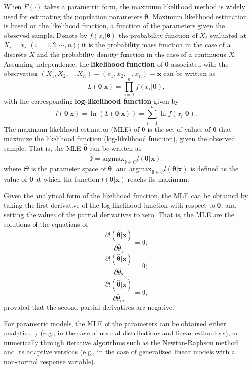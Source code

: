 \documentclass[]{book}
\theoremstyle{definition}
\theoremstyle{definition}
\theoremstyle{definition}
\theoremstyle{remark}
\begin{document}
When \(F(\cdot)\) takes a parametric form, the maximum likelihood method
is widely used for estimating the population parameters
\(\boldsymbol{\theta}\). Maximum likelihood estimation is based on the
likelihood function, a function of the parameters given the observed
sample. Denote by \(f(x_i|\boldsymbol{\theta})\) the probability
function of \(X_i\) evaluated at \(X_i=x_i\) \((i=1,2,\cdots,n)\); it is
the probability mass function in the case of a discrete \(X\) and the
probability density function in the case of a continuous \(X\). Assuming
independence, the \textbf{likelihood function} of
\(\boldsymbol{\theta}\) associated with the observation
\((X_1,X_2,\cdots,X_n)=(x_1,x_2,\cdots,x_n)=\mathbf{x}\) can be written
as
\[L(\boldsymbol{\theta}|\mathbf{x})=\prod_{i=1}^nf(x_i|\boldsymbol{\theta}),\]
with the corresponding \textbf{log-likelihood function} given by
\[l(\boldsymbol{\theta}|\mathbf{x})=\ln(L(\boldsymbol{\theta}|\mathbf{x}))=\sum_{i=1}^n\ln f(x_i|\boldsymbol{\theta}).\]
The maximum likelihood estimator (MLE) of \(\boldsymbol{\theta}\) is the
set of values of \(\boldsymbol{\theta}\) that maximize the likelihood
function (log-likelihood function), given the observed sample. That is,
the MLE \(\hat{\boldsymbol{\theta}}\) can be written as
\[\hat{\boldsymbol{\theta}}={\mbox{argmax}}_{\boldsymbol{\theta}\in\Theta}l(\boldsymbol{\theta}|\mathbf{x}),\]
where \(\Theta\) is the parameter space of \(\boldsymbol{\theta}\), and
\({\mbox{argmax}}_{\boldsymbol{\theta}\in\Theta}l(\boldsymbol{\theta}|\mathbf{x})\)
is defined as the value of \(\boldsymbol{\theta}\) at which the function
\(l(\boldsymbol{\theta}|\mathbf{x})\) reachs its maximum.

Given the analytical form of the likelihood function, the MLE can be
obtained by taking the first derivative of the log-likelihood function
with respect to \(\boldsymbol{\theta}\), and setting the values of the
partial derivatives to zero. That is, the MLE are the solutions of the
equations of
\[\frac{\partial l(\hat{\boldsymbol{\theta}}|\mathbf{x})}{\partial\hat{\theta}_1}=0;\]
\[\frac{\partial l(\hat{\boldsymbol{\theta}}|\mathbf{x})}{\partial\hat{\theta}_2}=0;\]
\[\cdots\]
\[\frac{\partial l(\hat{\boldsymbol{\theta}}|\mathbf{x})}{\partial\hat{\theta}_m}=0,\]
provided that the second partial derivatives are negative.

For parametric models, the MLE of the parameters can be obtained either
analytically (e.g., in the case of normal distributions and linear
estimators), or numerically through iterative algorithms such as the
Newton-Raphson method and its adaptive versions (e.g., in the case of
generalized linear models with a non-normal response variable).
\end{document}
